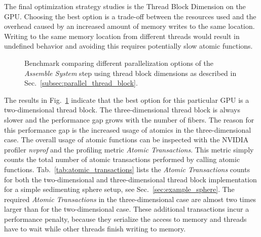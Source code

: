 The final optimization strategy studies is the Thread Block Dimension on the GPU. Choosing the best option is a trade-off between the resources used and the overhead caused by an increased amount of memory writes to the same location. Writing to the same memory location from different threads would result in undefined behavior and avoiding this requires potentially slow atomic functions.

\begin{figure}[!htbp]
  \centering
  \caption[Benchmarking thread block dimensions.]{Benchmark comparing different parallelization options of the \emph{Assemble System} step using thread block dimensions as described in Sec.~\ref{subsec:parallel_thread_block}. }
  \label{fig:bench_cuda_thread_blocks}
\end{figure}

The results in Fig.~\ref{fig:bench_cuda_thread_blocks} indicate that the best option for this particular GPU is a two-dimensional thread block. The three-dimensional thread block is always slower and the performance gap grows with the number of fibers. The reason for this performance gap is the increased usage of atomics in the three-dimensional case. The overall usage of atomic functions can be inspected with the NVIDIA profiler \emph{nvprof} and the profiling metric \emph{Atomic Transactions}. This metric simply counts the total number of atomic transactions performed by calling atomic functions. Tab.~\ref{tab:atomic_transactions} lists the \emph{Atomic Transactions} counts for both the two-dimensional and three-dimensional thread block implementation for a simple sedimenting sphere setup, see Sec.~\ref{sec:example_sphere}. The required \emph{Atomic Transactions} in the three-dimensional case are almost two times larger than for the two-dimensional case. These additional transactions incur a performance penalty, because they serialize the access to memory and threads have to wait while other threads finish writing to memory.

